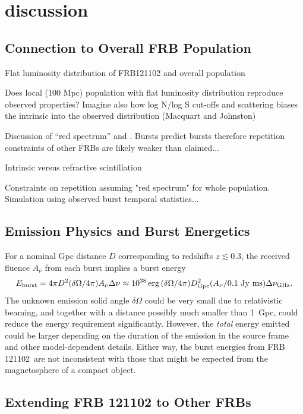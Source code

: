 \documentclass{emulateapj}
\newcommand{\frb}{FRB 121102}
\begin{document}
\section{discussion}

\subsection{Connection to Overall FRB Population}

Flat luminosity distribution of FRB121102 and overall population

Does local (100 Mpc) population with flat luminosity distribution reproduce observed properties? Imagine also how log N/log S cut-offs and scattering biases the intrinsic into the observed distribution (Macquart and Johnston)

Discussion of ``red spectrum'' and \citet{2016MNRAS.458L..89C}. Bursts predict bursts therefore repetition constraints of other FRBs are likely weaker than claimed...

Intrinsic versus refractive scintillation

Constraints on repetition assuming "red spectrum" for whole population. Simulation using observed burst temporal statistics...


\subsection{Emission Physics and Burst Energetics}

For a nominal Gpc distance $D$ corresponding to redshifts $z\lesssim 0.3$, the received fluence $A_{\nu}$ from each burst implies  a burst energy
$$E_{\rm burst} = 4\pi D^2 (\delta\Omega/4\pi) A_{\nu} \Delta\nu
\approx 10^{38}\, {\rm erg}\,(\delta\Omega/4\pi) D_{\rm Gpc}^2  (A_{\nu} / 0.1\ {\rm Jy\ ms}) \Delta\nu_{\rm GHz}.$$
The unknown  emission solid angle $\delta\Omega$
could be very small due to relativistic beaming, and together with a distance possibly much smaller than 1~Gpc, could reduce the energy requirement significantly.  However, the {\it total} energy emitted could be larger depending on the duration of the emission in the source frame and other model-dependent details.
Either way, the burst energies from \frb\ are not inconsistent with those that might be expected from the magnetosphere of a compact object\cite{cw16}.

\subsection{Extending FRB 121102 to Other FRBs}
\end{document}
